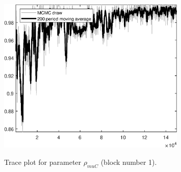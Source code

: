 \begin{figure}[H]
\centering
  \includegraphics[width=0.8\textwidth]{BRS_sectoral_KK/graphs/TracePlot_rho_muC_blck_1}\\
    \caption{Trace plot for parameter ${\rho_{muC}}$ (block number 1).}
\end{figure}
